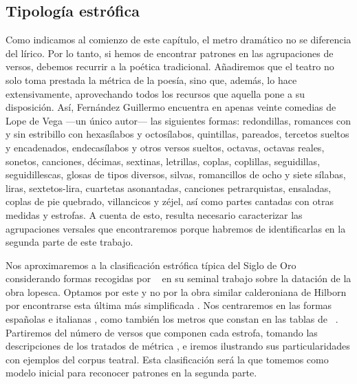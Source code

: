 \subsection{Tipología estrófica}
Como indicamos al comienzo de este capítulo, el metro dramático no se diferencia del lírico. Por lo tanto, si hemos de encontrar patrones en las agrupaciones de versos, debemos recurrir a la poética tradicional. Añadiremos que el teatro no solo toma prestada la métrica de la poesía, sino que, además, lo hace extensivamente, aprovechando todos los recursos que aquella pone a su disposición. Así, Fernández Guillermo \parencite*[213-242]{fernandez2021} encuentra en apenas veinte comedias de Lope de Vega —un único autor— las siguientes formas: redondillas, romances con y sin estribillo con hexasílabos y octosílabos, quintillas, pareados, tercetos sueltos y encadenados, endecasílabos y otros versos sueltos, octavas, octavas reales, sonetos, canciones, décimas, sextinas, letrillas, coplas, coplillas, seguidillas, seguidillescas, glosas de tipos diversos, silvas, romancillos de ocho y siete sílabas, liras, sextetos-lira, cuartetas asonantadas, canciones petrarquistas, ensaladas, coplas de pie quebrado, villancicos y zéjel, así como partes cantadas con otras medidas y estrofas. A cuenta de esto, resulta necesario caracterizar las agrupaciones versales que encontraremos porque habremos de identificarlas en la segunda parte de este trabajo.

Nos aproximaremos a la clasificación estrófica típica del Siglo de Oro considerando formas recogidas por \citeauthor{morley1968}~\parencite*{morley1968} en su seminal trabajo sobre la datación de la obra lopesca. Optamos por este y no por la obra similar calderoniana de Hilborn~\parencite*{hilborn1938} por encontrarse esta última más simplificada \parencite[3-4]{antonucci2023}. Nos centraremos en las formas españolas \parencite[38-39]{morley1968} e italianas , como también los metros que constan en las tablas de \citeauthor{fernandez2021}~\parencite*[213-242]{fernandez2021}. Partiremos del número de versos que componen cada estrofa, tomando las descripciones de los tratados de métrica \parencites[102-153]{herrero1996}[100-119]{quilis2013}, e iremos ilustrando sus particularidades con ejemplos del corpus teatral. Esta clasificación será la que tomemos como modelo inicial para reconocer patrones en la segunda parte.

